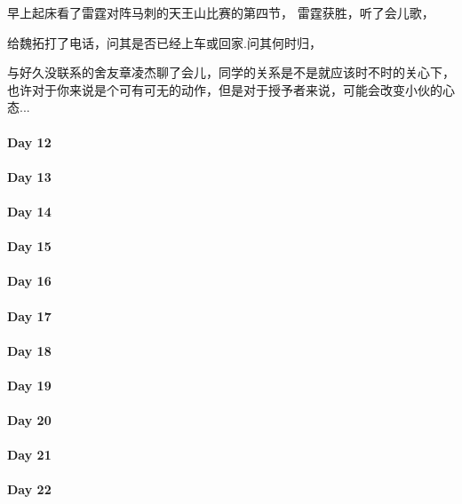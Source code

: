 \documentclass[UTF8,a4paper,8pt]{ctexbook}
\begin{document}
	 	 早上起床看了雷霆对阵马刺的天王山比赛的第四节， 雷霆获胜，听了会儿歌，
	 	 
	 	 给魏拓打了电话，问其是否已经上车或回家.问其何时归，
	 	 
	 	 与好久没联系的舍友章凌杰聊了会儿，同学的关系是不是就应该时不时的关心下，也许对于你来说是个可有可无的动作，但是对于授予者来说，可能会改变小伙的心态...
	 	 
	 	 
 	 \paragraph{Day 12      \quad     }
 	 \paragraph{Day 13      \quad     }
 	 \paragraph{Day 14      \quad     }
 	 \paragraph{Day 15      \quad     }
 	 \paragraph{Day 16      \quad     }
 	 \paragraph{Day 17      \quad     }
 	 \paragraph{Day 18      \quad     }
 	 \paragraph{Day 19      \quad     }
 	 \paragraph{Day 20      \quad     }
 	 \paragraph{Day 21      \quad     }
 	 \paragraph{Day 22      \quad     }
\end{document}
